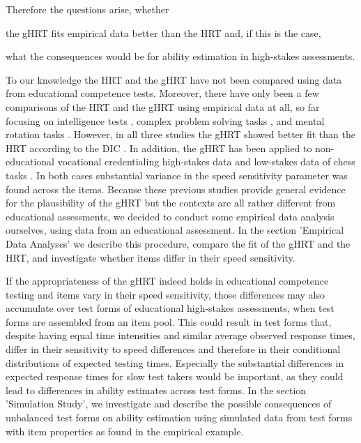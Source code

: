 \documentclass[a4paper,man,apacite,donotrepeattitle]{apa6}
\begin{document}
Therefore the questions arise, whether
\begin{seriate} 
\item the gHRT fits empirical data better than the HRT and, if this is the case,
\item what the consequences would be for ability estimation in high-stakes assessments. 
\end{seriate}
To our knowledge the HRT and the gHRT have not been compared using data from educational competence tests. Moreover, there have only been a few comparisons of the HRT and the gHRT using empirical data at all, so far focusing on intelligence tests \cite{Goldhammer.2011}, complex problem solving tasks \cite{Scherer.2015}, and mental rotation tasks \cite{Debelak.2014}. However, in all three studies the gHRT showed better fit than the HRT according to the DIC \cite{Spiegelhalter.2002}. In addition, the gHRT has been applied to non-educational vocational credentialing high-stakes data \cite{Fox.2017} and low-stakes data of chess tasks \cite{Fox.2016}. In both cases substantial variance in the speed sensitivity parameter was found across the items. Because these previous studies provide general evidence for the plausibility of the gHRT but the contexts are all rather different from educational assessments, we decided to conduct some empirical data analysis ourselves, using data from an educational assessment. In the section 'Empirical Data Analyses' we describe this procedure, compare the fit of the gHRT and the HRT, and investigate whether items differ in their speed sensitivity.

If the appropriateness of the gHRT indeed holds in educational competence testing and items vary in their speed sensitivity, those differences may also accumulate over test forms of educational high-stakes assessments, when test forms are assembled from an item pool. This could result in test forms that, despite having equal time intensities and similar average observed response times, differ in their sensitivity to speed differences and therefore in their conditional distributions of expected testing times. Especially the substantial differences in expected response times for slow test takers would be important, as they could lead to differences in ability estimates across test forms.  In the section 'Simulation Study', we investigate and describe the possible consequences of unbalanced test forms on ability estimation using simulated data from test forms with item properties as found in the empirical example.
\end{document}
